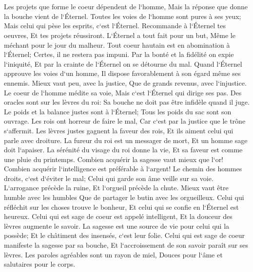 \chapter{}

\verse Les projets que forme le coeur dépendent de l`homme, Mais la réponse que donne la bouche vient de l`Éternel. 
\verse Toutes les voies de l`homme sont pures à ses yeux; Mais celui qui pèse les esprits, c`est l`Éternel. 
\verse Recommande à l`Éternel tes oeuvres, Et tes projets réussiront. 
\verse L`Éternel a tout fait pour un but, Même le méchant pour le jour du malheur. 
\verse Tout coeur hautain est en abomination à l`Éternel; Certes, il ne restera pas impuni. 
\verse Par la bonté et la fidélité on expie l`iniquité, Et par la crainte de l`Éternel on se détourne du mal. 
\verse Quand l`Éternel approuve les voies d`un homme, Il dispose favorablement à son égard même ses ennemis. 
\verse Mieux vaut peu, avec la justice, Que de grands revenus, avec l`injustice. 
\verse Le coeur de l`homme médite sa voie, Mais c`est l`Éternel qui dirige ses pas. 
\verse Des oracles sont sur les lèvres du roi: Sa bouche ne doit pas être infidèle quand il juge. 
\verse Le poids et la balance justes sont à l`Éternel; Tous les poids du sac sont son ouvrage. 
\verse Les rois ont horreur de faire le mal, Car c`est par la justice que le trône s`affermit. 
\verse Les lèvres justes gagnent la faveur des rois, Et ils aiment celui qui parle avec droiture. 
\verse La fureur du roi est un messager de mort, Et un homme sage doit l`apaiser. 
\verse La sérénité du visage du roi donne la vie, Et sa faveur est comme une pluie du printemps. 
\verse Combien acquérir la sagesse vaut mieux que l`or! Combien acquérir l`intelligence est préférable à l`argent! 
\verse Le chemin des hommes droits, c`est d`éviter le mal; Celui qui garde son âme veille sur sa voie. 
\verse L`arrogance précède la ruine, Et l`orgueil précède la chute. 
\verse Mieux vaut être humble avec les humbles Que de partager le butin avec les orgueilleux. 
\verse Celui qui réfléchit sur les choses trouve le bonheur, Et celui qui se confie en l`Éternel est heureux. 
\verse Celui qui est sage de coeur est appelé intelligent, Et la douceur des lèvres augmente le savoir. 
\verse La sagesse est une source de vie pour celui qui la possède; Et le châtiment des insensés, c`est leur folie. 
\verse Celui qui est sage de coeur manifeste la sagesse par sa bouche, Et l`accroissement de son savoir paraît sur ses lèvres. 
\verse Les paroles agréables sont un rayon de miel, Douces pour l`âme et salutaires pour le corps. 
